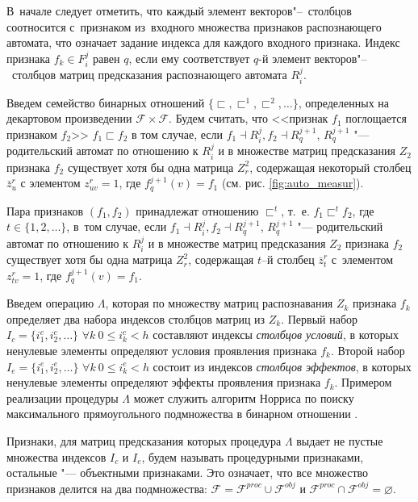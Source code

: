 \documentclass[a4paper, 12pt]{article}
\numberwithin{equation}{section}
\begin{document}
	В~начале следует отметить, что каждый элемент векторов"--~столбцов соотносится с~признаком из~входного множества признаков распознающего автомата, что означает задание индекса для каждого входного признака. Индекс признака $f_k\in F_i^j$ равен  $q$, если ему соответствует $q$-й элемент векторов"--~столбцов матриц предсказания распознающего автомата $R_i^j$. 
	
	Введем семейство бинарных отношений $\{\sqsubset,\sqsubset^1,\sqsubset^2,\dots\}$, определенных на декартовом произведении $\mathcal F\times \mathcal F$. Будем считать, что <<признак $f_1$ поглощается признаком $f_2$>> $f_1\sqsubset f_2$ в том случае, если $f_1\dashv R_i^j, f_2\dashv R_q^{j+1}$, $R_q^{j+1}$ "--- родительский автомат по отношению к $R_i^j$ и в множестве матриц предсказания $Z_2$ признака $f_2$ существует хотя бы одна матрица $Z_r^2$, содержащая некоторый столбец $\bar z_u^r$ с элементом $z_{uv}^r=1$, где $f_q^{j+1}(v)=f_1$ (см. рис. \ref{fig:auto_measur}).
		
	Пара признаков $(f_1,f_2)$ принадлежат отношению $\sqsubset^t$, т.~е. $f_1\sqsubset^t f_2$, где $t\in\{1,2,\dots\}$, в~том случае, если $f_1\dashv R_i^j, f_2\dashv R_q^{j+1}$, $R_q^{j+1}$ "--- родительский автомат по отношению к $R_i^j$ и в множестве матриц предсказания $Z_2$ признака $f_2$ существует хотя бы одна матрица $Z_r^2$, содержащая $t$–й столбец $\bar z_t^r$ с~элементом $z_{tv}^r=1$, где $f_q^{j+1}(v)=f_1$.	
	
	Введем операцию $\Lambda$, которая по множеству матриц распознавания $Z_k$ признака $f_k$ определяет два набора индексов столбцов матриц из $Z_k$. Первый набор $I_c=\{i_1^c,i_2^c,\dots\}$ $\forall k\ 0\leqslant i_k^c < h$ составляют индексы \textit{столбцов условий}, в которых ненулевые элементы определяют условия проявления признака $f_k$. Второй набор $I_e=\{i_1^e,i_2^e,\dots\}$ $\forall k\ 0\leqslant i_k^e < h$ состоит из индексов  \textit{столбцов эффектов}, в которых ненулевые элементы определяют эффекты проявления признака $f_k$. Примером реализации процедуры $\Lambda$ может служить алгоритм Норриса по поиску максимального прямоугольного подмножества в бинарном отношении \cite{Norris1977}.
	
	Признаки, для матриц предсказания которых процедура $\Lambda$ выдает не пустые множества индексов $I_c$ и $I_e$, будем называть процедурными признаками, остальные "--- объектными признаками. Это означает, что все множество признаков делится на два подмножества: $\mathcal F=\mathcal F^{proc}\cup\mathcal F^{obj}$ и $\mathcal F^{proc}\cap\mathcal F^{obj}=\varnothing$.	
\end{document}
